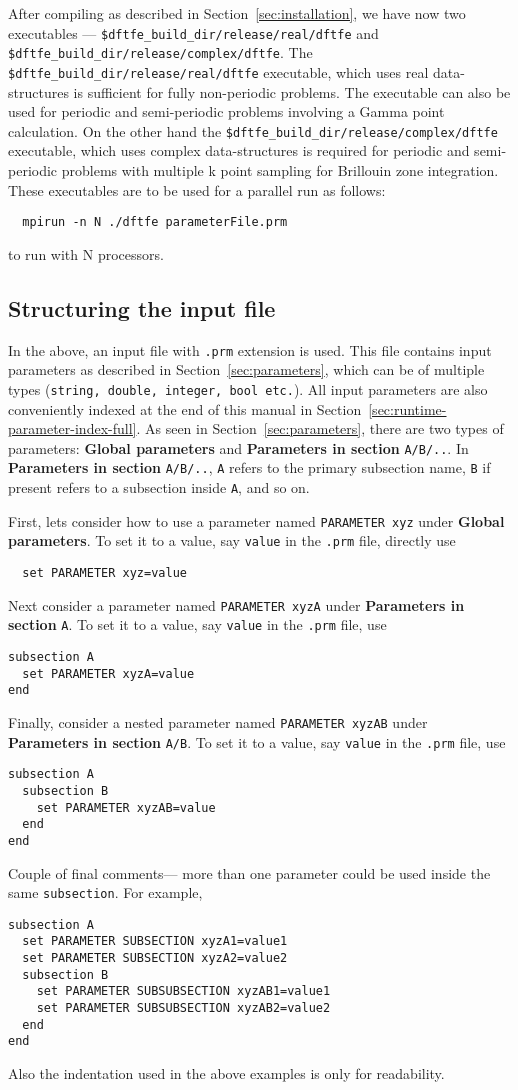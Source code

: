 After compiling \dftfe{} as described in Section~\ref{sec:installation}, we have now two executables --- \verb|$dftfe_build_dir/release/real/dftfe| and \verb|$dftfe_build_dir/release/complex/dftfe|. The \verb|$dftfe_build_dir/release/real/dftfe| executable, which uses real data-structures is sufficient for fully non-periodic problems. The executable can also be used for periodic and semi-periodic problems involving a Gamma point calculation. On the other hand the \verb|$dftfe_build_dir/release/complex/dftfe| executable, which uses complex data-structures is required for periodic and semi-periodic problems with multiple k point sampling for Brillouin zone integration. These executables are to be used for a parallel run as follows:
\begin{verbatim}
  mpirun -n N ./dftfe parameterFile.prm
\end{verbatim}
to run with N processors. 
\subsection{Structuring the input file}
In the above, an input file with \verb|.prm| extension is used. This file contains input parameters as described in Section~\ref{sec:parameters}, which can be of multiple types (\verb|string, double, integer, bool etc.|). All input parameters are also conveniently indexed at the end of this manual in Section~\ref{sec:runtime-parameter-index-full}. As seen in Section~\ref{sec:parameters}, there are two types of parameters: {\bf Global parameters} and {\bf Parameters in section} \verb|A/B/..|. In {\bf Parameters in section} \verb|A/B/..|, \verb|A| refers to the primary subsection name, \verb|B| if present refers to a subsection inside \verb|A|, and so on. 

First, lets consider how to use a parameter named \verb|PARAMETER xyz| under {\bf Global parameters}. To set it to a value, say \verb|value|  in the  \verb|.prm| file, directly use
\begin{verbatim}
  set PARAMETER xyz=value
\end{verbatim}
Next consider a parameter named \verb|PARAMETER xyzA| under {\bf Parameters in section} \verb|A|. To set it to a value, say \verb|value|  in the  \verb|.prm| file, use 
\begin{verbatim}
subsection A
  set PARAMETER xyzA=value
end
\end{verbatim}
Finally, consider a nested parameter named  \verb|PARAMETER xyzAB| under {\bf Parameters in section} \verb|A/B|. To set it to a value, say \verb|value|  in the  \verb|.prm| file, use 
\begin{verbatim}
subsection A
  subsection B
    set PARAMETER xyzAB=value
  end
end
\end{verbatim}
Couple of final comments--- more than one parameter could be used inside the same \verb|subsection|. For example,
\begin{verbatim}
subsection A
  set PARAMETER SUBSECTION xyzA1=value1
  set PARAMETER SUBSECTION xyzA2=value2
  subsection B
    set PARAMETER SUBSUBSECTION xyzAB1=value1
    set PARAMETER SUBSUBSECTION xyzAB2=value2
  end
end
\end{verbatim}
Also the indentation used in the above examples is only for readability.
